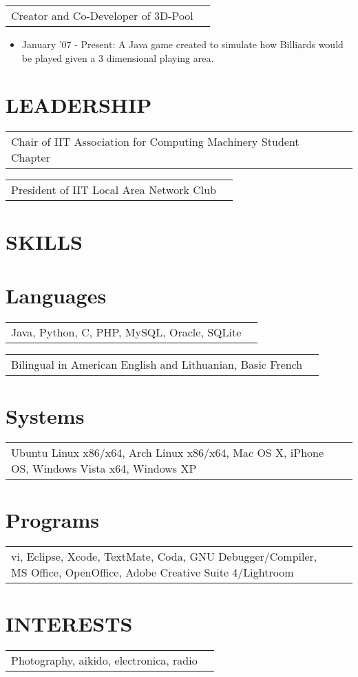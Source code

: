 \documentclass[margin, line]{res}
\begin{document}
\begin{resume}
\begin{tabular}{p{3in} r}
	Creator and Co-Developer of 3D-Pool
\end{tabular}	
	\begin{itemize} \itemsep -2pt
		\item[] January '07 - Present: A Java game created to simulate how Billiards would be played given a 3 dimensional playing area.
	\end{itemize}

\section{LEADERSHIP}
	\begin{tabular}{p{6in} r} \itemsep -2pt
		Chair of IIT Association for Computing Machinery Student Chapter
	\end{tabular} 
	\begin{tabular}{p{6in} r} \itemsep -2pt
		President of IIT Local Area Network Club
	\end{tabular} 

\section{SKILLS} 
\normalsize{\section{Languages}}
	\begin{tabular} {p{6in} r}
		Java, Python, C, PHP, MySQL, Oracle, SQLite
		\end{tabular}
	\begin{tabular} {p{5in} r}
		Bilingual in American English and Lithuanian, Basic French
		\end{tabular}
\normalsize{\section{Systems}} 
	\begin{tabular} {p{5in} r}
		Ubuntu Linux x86/x64, Arch Linux x86/x64, Mac OS X, iPhone OS, Windows Vista x64, Windows XP
	\end{tabular}
\normalsize{\section{Programs}}
	\begin{tabular} {p{5in} r}
		vi, Eclipse, Xcode, TextMate, Coda, GNU Debugger/Compiler, MS Office, OpenOffice, Adobe Creative Suite 4/Lightroom
		\end{tabular}

\section{INTERESTS}
	\begin{tabular} {p{6in} r}
	Photography, aikido, electronica, radio
 	\end{tabular}
\end{resume} 
\end{document}
